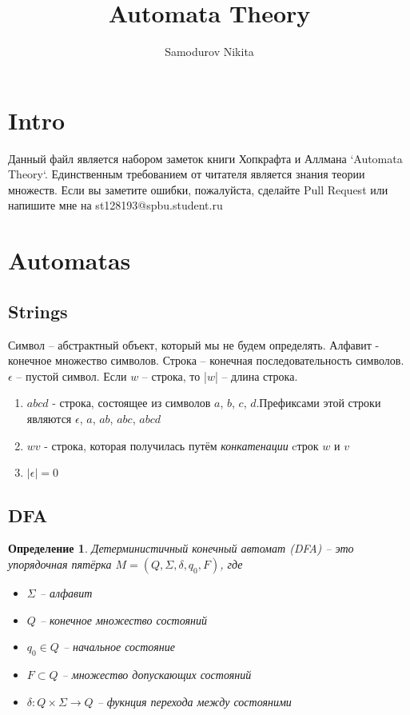 \documentclass[5pt]{article}
\title{Automata Theory}
\author{Samodurov Nikita}
\newtheorem{definition}{Определение}
\begin{document}
\maketitle

\tableofcontents
\newpage

\section{Intro}

Данный файл является набором заметок книги Хопкрафта и Аллмана `Automata Theory`.
Единственным требованием от читателя является знания теории множеств.
Если вы заметите ошибки, пожалуйста, сделайте Pull Request или напишите мне на st128193@spbu.student.ru

\newpage
\section{Automatas}
\subsection{Strings}


Символ -- абстрактный объект, который мы не будем определять. Алфавит - конечное множество символов.
Строка -- конечная последовательность символов.
$\epsilon$ -- пустой символ.
Если $w$ -- строка, то |$w$| -- длина строка.

\begin{enumerate}
  \item $abcd$ - строка, состоящее из символов $a$, $b$, $c$, $d$.Префиксами этой строки являются $\epsilon$, $a$, $ab$, $abc$, $abcd$
  \item $wv$ - строка, которая получилась путём \textit{конкатенации} cтрок $w$ и $v$
  \item $|\epsilon| = 0$
\end{enumerate}

\subsection{DFA}

\begin{definition}
Детерминистичный конечный автомат (DFA) -- это упорядочная пятёрка
$M = (Q, \Sigma, \delta ,q_0, F)$, где

\begin{itemize}
  \item $\Sigma$ -- алфавит
  \item $Q$ -- конечное множество состояний
  \item $q_0 \in Q$ -- начальное состояние
  \item $F \subset Q$ -- множество допускающих состояний
  \item $\delta: Q \times \Sigma \rightarrow Q$ -- фукнция перехода между состояними
\end{itemize}
\end{definition}
\end{document}
